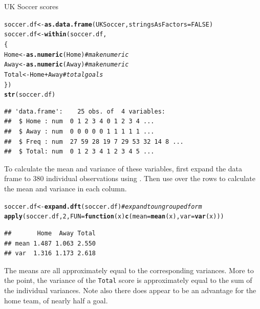 \documentclass[11pt]{book}\usepackage[]{graphicx}\usepackage[]{color}
\makeatletter
\newcommand{\hlnum}[1]{\textcolor[rgb]{0.686,0.059,0.569}{#1}}%
\newcommand{\hlcom}[1]{\textcolor[rgb]{0.678,0.584,0.686}{\textit{#1}}}%
\newcommand{\hlopt}[1]{\textcolor[rgb]{0,0,0}{#1}}%
\newcommand{\hlstd}[1]{\textcolor[rgb]{0.345,0.345,0.345}{#1}}%
\newcommand{\hlkwa}[1]{\textcolor[rgb]{0.161,0.373,0.58}{\textbf{#1}}}%
\newcommand{\hlkwb}[1]{\textcolor[rgb]{0.69,0.353,0.396}{#1}}%
\newcommand{\hlkwc}[1]{\textcolor[rgb]{0.333,0.667,0.333}{#1}}%
\newcommand{\hlkwd}[1]{\textcolor[rgb]{0.737,0.353,0.396}{\textbf{#1}}}%
\newenvironment{kframe}{%
 \def\at@end@of@kframe{}%
 \ifinner\ifhmode%
  \def\at@end@of@kframe{\end{minipage}}%
  \begin{minipage}{\columnwidth}%
 \fi\fi%
 \def\FrameCommand##1{\hskip\@totalleftmargin \hskip-\fboxsep
 \colorbox{shadecolor}{##1}\hskip-\fboxsep
     \hskip-\linewidth \hskip-\@totalleftmargin \hskip\columnwidth}%
 \MakeFramed {\advance\hsize-\width
   \@totalleftmargin\z@ \linewidth\hsize
   \@setminipage}}%
 {\par\unskip\endMakeFramed%
 \at@end@of@kframe}
\newenvironment{knitrout}{}{} %
\renewenvironment{knitrout}{\small\renewcommand{\baselinestretch}{.85}}{} %
\makeatother
\begin{document}
\begin{Example}[soccer]{UK Soccer scores}
\begin{knitrout}
\begin{kframe}
\begin{alltt}
\hlstd{soccer.df} \hlkwb{<-} \hlkwd{as.data.frame}\hlstd{(UKSoccer,} \hlkwc{stringsAsFactors}\hlstd{=}\hlnum{FALSE}\hlstd{)}
\hlstd{soccer.df} \hlkwb{<-} \hlkwd{within}\hlstd{(soccer.df,}
  \hlstd{\{}
  \hlstd{Home} \hlkwb{<-} \hlkwd{as.numeric}\hlstd{(Home)}          \hlcom{# make numeric}
  \hlstd{Away} \hlkwb{<-} \hlkwd{as.numeric}\hlstd{(Away)}          \hlcom{# make numeric}
  \hlstd{Total} \hlkwb{<-} \hlstd{Home} \hlopt{+} \hlstd{Away}              \hlcom{# total goals}
  \hlstd{\})}
\hlkwd{str}\hlstd{(soccer.df)}
\end{alltt}
\begin{verbatim}
## 'data.frame':	25 obs. of  4 variables:
##  $ Home : num  0 1 2 3 4 0 1 2 3 4 ...
##  $ Away : num  0 0 0 0 0 1 1 1 1 1 ...
##  $ Freq : num  27 59 28 19 7 29 53 32 14 8 ...
##  $ Total: num  0 1 2 3 4 1 2 3 4 5 ...
\end{verbatim}
\end{kframe}
\end{knitrout}

To calculate the mean and variance of these variables, first expand
the data frame to 380 individual observations using .
Then use  over the rows to calculate the mean and variance
in each column.
\begin{knitrout}
\color{fgcolor}\begin{kframe}
\begin{alltt}
\hlstd{soccer.df} \hlkwb{<-} \hlkwd{expand.dft}\hlstd{(soccer.df)}   \hlcom{# expand to ungrouped form}
\hlkwd{apply}\hlstd{(soccer.df,} \hlnum{2}\hlstd{,} \hlkwc{FUN}\hlstd{=}\hlkwa{function}\hlstd{(}\hlkwc{x}\hlstd{)} \hlkwd{c}\hlstd{(}\hlkwc{mean}\hlstd{=}\hlkwd{mean}\hlstd{(x),} \hlkwc{var}\hlstd{=}\hlkwd{var}\hlstd{(x)))}
\end{alltt}
\begin{verbatim}
##       Home  Away Total
## mean 1.487 1.063 2.550
## var  1.316 1.173 2.618
\end{verbatim}
\end{kframe}
\end{knitrout}


The means are all approximately equal to the corresponding variances.
More to the point, the variance of the \texttt{Total} score
is approximately equal to the sum of the individual variances.
Note also there does appear to be an advantage for the home team,
of nearly half a goal.

\end{Example}
\end{document}
